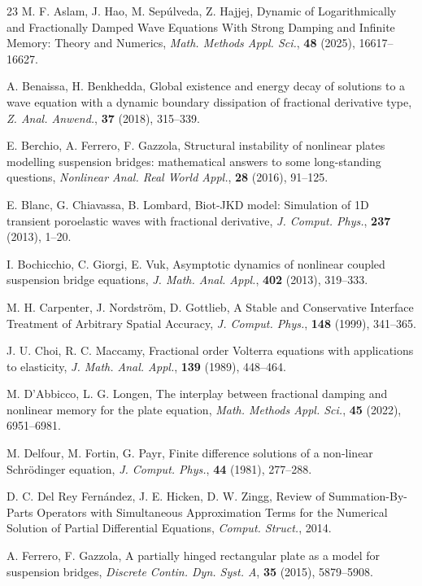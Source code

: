 \documentclass[12pt]{article}
\numberwithin{equation}{section}
\begin{document}
\begin{thebibliography}{23}
M. F. Aslam, J. Hao, M. Sepúlveda, Z. Hajjej, Dynamic of Logarithmically and Fractionally Damped Wave Equations With Strong Damping and Infinite Memory: Theory and Numerics, {\it Math. Methods Appl. Sci.}, \textbf{48} (2025), 16617--16627.

A. Benaissa, H. Benkhedda, Global existence and energy decay of solutions to a wave equation with a dynamic boundary dissipation of fractional derivative type, {\it Z. Anal. Anwend.}, \textbf{37} (2018), 315--339.

E. Berchio, A. Ferrero, F. Gazzola, Structural instability of nonlinear plates modelling suspension bridges: mathematical answers to some long-standing questions, {\it Nonlinear Anal. Real World Appl.}, \textbf{28} (2016), 91--125.

E. Blanc, G. Chiavassa, B. Lombard, Biot-JKD model: Simulation of 1D transient poroelastic waves with fractional derivative, {\it J. Comput. Phys.}, \textbf{237} (2013), 1--20.

I. Bochicchio, C. Giorgi, E. Vuk, Asymptotic dynamics of nonlinear coupled suspension bridge equations, {\it J. Math. Anal. Appl.}, \textbf{402} (2013), 319--333.

M. H. Carpenter, J. Nordstr\"om, D. Gottlieb, A Stable and Conservative Interface Treatment of Arbitrary Spatial Accuracy, {\it J. Comput. Phys.}, \textbf{148} (1999), 341--365.

J. U. Choi, R. C. Maccamy, Fractional order Volterra equations with applications to elasticity, {\it J. Math. Anal. Appl.}, \textbf{139} (1989), 448--464.

M. D'Abbicco, L. G. Longen, The interplay between fractional damping and nonlinear memory for the plate equation, {\it Math. Methods Appl. Sci.}, \textbf{45} (2022), 6951--6981.

M. Delfour, M. Fortin, G. Payr, Finite difference solutions of a non-linear Schrödinger equation, {\it J. Comput. Phys.}, \textbf{44} (1981), 277--288.

D. C. Del Rey Fern\'andez, J. E. Hicken, D. W. Zingg, Review of Summation-By-Parts Operators with Simultaneous Approximation Terms for the Numerical Solution of Partial Differential Equations, {\it Comput. Struct.}, 2014.

A. Ferrero, F. Gazzola, A partially hinged rectangular plate as a model for suspension bridges, {\it Discrete Contin. Dyn. Syst. A}, \textbf{35} (2015), 5879--5908.




\end{thebibliography}
\end{document}
